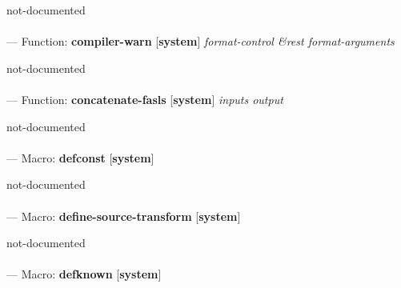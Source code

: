 \begin{adjustwidth}{5em}{5em}
not-documented
\end{adjustwidth}

\paragraph{}
\label{SYSTEM:COMPILER-WARN}
--- Function: \textbf{compiler-warn} [\textbf{system}] \textit{format-control \&rest format-arguments}

\begin{adjustwidth}{5em}{5em}
not-documented
\end{adjustwidth}

\paragraph{}
\label{SYSTEM:CONCATENATE-FASLS}
--- Function: \textbf{concatenate-fasls} [\textbf{system}] \textit{inputs output}

\begin{adjustwidth}{5em}{5em}
not-documented
\end{adjustwidth}

\paragraph{}
\label{SYSTEM:DEFCONST}
--- Macro: \textbf{defconst} [\textbf{system}] \textit{}

\begin{adjustwidth}{5em}{5em}
not-documented
\end{adjustwidth}

\paragraph{}
\label{SYSTEM:DEFINE-SOURCE-TRANSFORM}
--- Macro: \textbf{define-source-transform} [\textbf{system}] \textit{}

\begin{adjustwidth}{5em}{5em}
not-documented
\end{adjustwidth}

\paragraph{}
\label{SYSTEM:DEFKNOWN}
--- Macro: \textbf{defknown} [\textbf{system}] \textit{}

